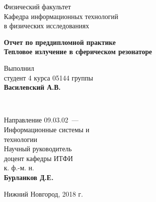 \makeatletter
\begin{titlepage}

	\newpage

    \noindent{}

	\vspace*{50pt}

	Физический факультет \\[\baselineskip]

	Кафедра информационных технологий\\
	в физических исследованиях

	\vspace*{100pt}

	{\large\textbf{Отчет по преддипломной практике}} \\[\baselineskip]

	{\Large\textbf{Тепловое излучение в сферическом резонаторе}}

	\vspace*{\fill}

	\hfill\begin{minipage}{15em}
    	Выполнил\\
		студент 4 курса 05144 группы\\
		\textbf{Василевский А.В.}
    \end{minipage} \\[\baselineskip]

	\hfill\begin{minipage}{15em}
		Направление 09.03.02~---\\
		Информационные системы и\\ технологии\\
    	Научный руководитель\\
		доцент кафедры ИТФИ\\
		к. ф.-м. н.\\
		\textbf{Бурланков Д.Е.}
    \end{minipage}

	\vspace*{\fill}

	Нижний Новгород, 2018 г.

\end{titlepage}
\makeatother
